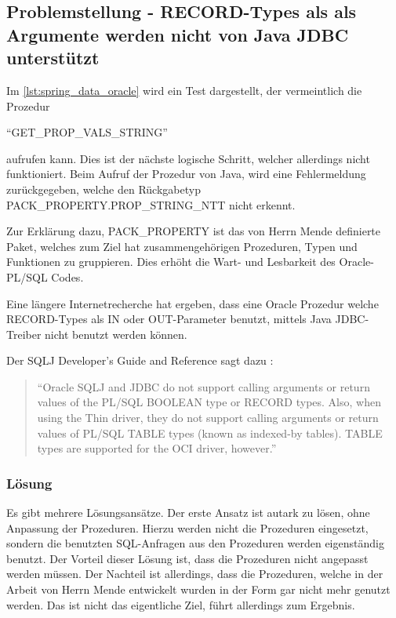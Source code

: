 \subsection{Problemstellung - RECORD-Types als als Argumente werden nicht von Java JDBC unterstützt}

Im \autoref{lst:spring_data_oracle} wird ein Test dargestellt, der vermeintlich die Prozedur 

\enquote{GET\_PROP\_VALS\_STRING} 

aufrufen kann. Dies ist der nächste logische Schritt, welcher allerdings nicht funktioniert. Beim Aufruf der Prozedur von Java, wird eine Fehlermeldung zurückgegeben, welche den Rückgabetyp PACK\_PROPERTY.PROP\_STRING\_NTT nicht erkennt. 

Zur Erklärung dazu, PACK\_PROPERTY ist das von Herrn Mende definierte Paket, welches zum Ziel hat zusammengehörigen Prozeduren, Typen und Funktionen zu gruppieren. Dies erhöht die Wart- und Lesbarkeit des Oracle-PL/SQL Codes. 

Eine längere Internetrecherche hat ergeben, dass eine Oracle Prozedur welche RECORD-Types als IN oder OUT-Parameter benutzt, mittels Java JDBC-Treiber nicht benutzt werden können. 

Der SQLJ Developer's Guide and Reference sagt dazu \citep[Kap. 5][]{oracle-dev-guide}:

\begin{quotation}
\enquote{Oracle SQLJ and JDBC do not support calling arguments or return values of the PL/SQL BOOLEAN type or RECORD types. Also, when using the Thin driver, they do not support calling arguments or return values of PL/SQL TABLE types (known as indexed-by tables). TABLE types are supported for the OCI driver, however.}
\end{quotation}

\subsubsection{Lösung}

Es gibt mehrere Lösungsansätze. Der erste Ansatz ist autark zu lösen, ohne Anpassung der Prozeduren. Hierzu werden nicht die Prozeduren eingesetzt, sondern die benutzten SQL-Anfragen aus den Prozeduren werden eigenständig benutzt. 
Der Vorteil dieser Lösung ist, dass die Prozeduren nicht angepasst werden müssen. Der Nachteil ist allerdings, dass die Prozeduren, welche in der Arbeit von Herrn Mende entwickelt wurden in der Form gar nicht mehr genutzt werden. Das ist nicht das eigentliche Ziel, führt allerdings zum Ergebnis. 

